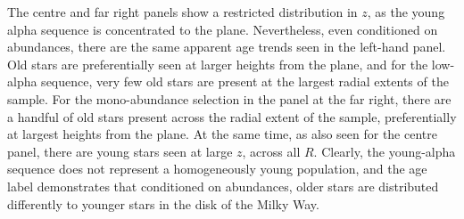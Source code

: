 \documentclass[12pt, preprint]{aastex}
\newcommand{\project}[1]{\textsl{#1}}
\newcommand{\apogee}{\project{APOGEE}}
\newcommand{\alphafe}{\mbox{$\rm [\alpha/Fe]$}}
\begin{document}
The centre and far right panels show a restricted distribution in  $z$, as the young alpha sequence is concentrated to the plane. Nevertheless, even conditioned on abundances, there are the same apparent age trends seen in the left-hand panel. Old stars are preferentially seen at larger heights from the plane, and for the low-alpha sequence, very few old stars are present at the largest radial extents of the sample. For the mono-abundance selection in the panel at the far right, there are a handful of old stars present across the radial extent of the sample, preferentially at largest heights from the plane. At the same time, as also seen for the centre panel, there are young stars seen at large $z$, across all $R$. Clearly, the young-alpha sequence does not represent a homogeneously young population, and the age label demonstrates that conditioned on abundances, older stars are distributed differently to younger stars in the disk of the Milky Way. 

%



%    
\end{document}
